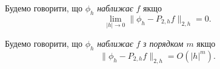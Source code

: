 \begin{definition}
    Будемо говорити, що $\phi_h$ \textit{наближає} $f$ якщо
    \begin{equation}
        \label{eq:4.1.16}
        \lim_{|h| \to 0} \|\phi_h - P_{2, h} f\|_{2, h} = 0.
    \end{equation}
\end{definition}

\begin{definition}
    Будемо говорити, що $\phi_h$ \textit{наближає} $f$ \textit{з порядком $m$} якщо
    \begin{equation}
        \label{eq:4.1.17}
        \|\phi_h - P_{2, h} f\|_{2, h} = O(|h|^m).
    \end{equation}
\end{definition}
